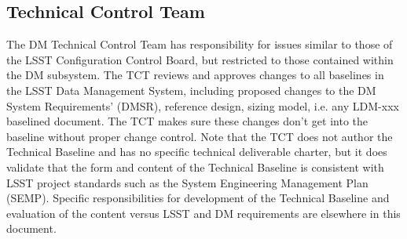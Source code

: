 \subsection{Technical Control Team}
The DM Technical Control Team has responsibility for issues similar to those of the LSST Configuration Control Board, but restricted to those contained within the DM subsystem. The TCT reviews and approves changes to all baselines in the LSST Data Management System, including proposed changes to the DM System Requirements' (DMSR), reference design, sizing model, i.e. any LDM-xxx baselined document.  The TCT makes sure these changes don't get into the baseline without proper change control.  Note that the TCT does not author the Technical Baseline and has no specific technical deliverable charter, but it does validate that the form and content of the Technical Baseline is consistent with LSST project standards such as the System Engineering Management Plan (SEMP).  Specific responsibilities for development of the Technical Baseline and evaluation of the content versus LSST and DM requirements are elsewhere in this document.
